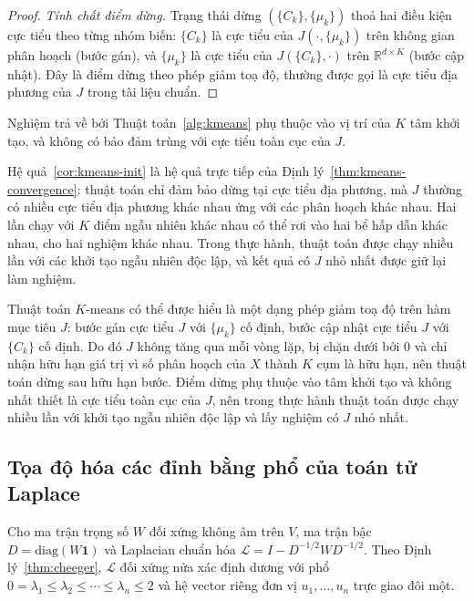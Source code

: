 \begin{proof}
\emph{Tính chất điểm dừng.} Trạng thái dừng $(\{C_k\}, \{\mu_k\})$ thoả hai điều kiện cực tiểu theo từng nhóm biến: $\{C_k\}$ là cực tiểu của $J(\cdot, \{\mu_k\})$ trên không gian phân hoạch (bước gán), và $\{\mu_k\}$ là cực tiểu của $J(\{C_k\}, \cdot)$ trên $\mathbb{R}^{d \times K}$ (bước cập nhật). Đây là điểm dừng theo phép giảm toạ độ, thường được gọi là cực tiểu địa phương của $J$ trong tài liệu chuẩn.
\end{proof}

\begin{corollary}
\label{cor:kmeans-init}
Nghiệm trả về bởi Thuật toán~\ref{alg:kmeans} phụ thuộc vào vị trí của $K$ tâm khởi tạo, và không có bảo đảm trùng với cực tiểu toàn cục của $J$.
\end{corollary}

Hệ quả~\ref{cor:kmeans-init} là hệ quả trực tiếp của Định lý~\ref{thm:kmeans-convergence}: thuật toán chỉ đảm bảo dừng tại cực tiểu địa phương, mà $J$ thường có nhiều cực tiểu địa phương khác nhau ứng với các phân hoạch khác nhau. Hai lần chạy với $K$ điểm ngẫu nhiên khác nhau có thể rơi vào hai bể hấp dẫn khác nhau, cho hai nghiệm khác nhau. Trong thực hành, thuật toán được chạy nhiều lần với các khởi tạo ngẫu nhiên độc lập, và kết quả có $J$ nhỏ nhất được giữ lại làm nghiệm.
\fi

Thuật toán $K$-means có thể được hiểu là một dạng phép giảm toạ độ trên hàm mục tiêu $J$: bước gán cực tiểu $J$ với $\{\mu_k\}$ cố định, bước cập nhật cực tiểu $J$ với $\{C_k\}$ cố định. Do đó $J$ không tăng qua mỗi vòng lặp, bị chặn dưới bởi $0$ và chỉ nhận hữu hạn giá trị vì số phân hoạch của $X$ thành $K$ cụm là hữu hạn, nên thuật toán dừng sau hữu hạn bước. Điểm dừng phụ thuộc vào tâm khởi tạo và không nhất thiết là cực tiểu toàn cục của $J$, nên trong thực hành thuật toán được chạy nhiều lần với khởi tạo ngẫu nhiên độc lập và lấy nghiệm có $J$ nhỏ nhất.

\subsection{Tọa độ hóa các đỉnh bằng phổ của toán tử Laplace}
\label{subsec:spectral-embedding}

Cho ma trận trọng số $W$ đối xứng không âm trên $V$, ma trận bậc $D = \mathrm{diag}(W \mathbf{1})$ và Laplacian chuẩn hóa $\mathcal{L} = I - D^{-1/2} W D^{-1/2}$. Theo Định lý~\ref{thm:cheeger}, $\mathcal{L}$ đối xứng nửa xác định dương với phổ $0 = \lambda_1 \leq \lambda_2 \leq \cdots \leq \lambda_n \leq 2$ và hệ vector riêng đơn vị $u_1, \ldots, u_n$ trực giao đôi một.

